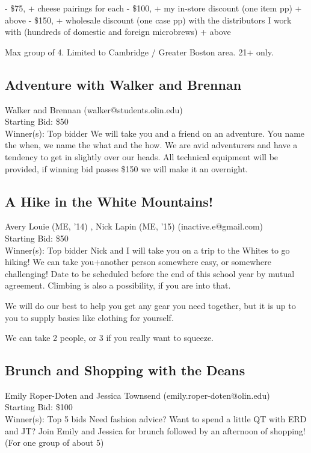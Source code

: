 \documentclass[11pt]{article}
\begin{document}
- \$75, + cheese pairings for each
- \$100, + my in-store discount (one item pp) + above
- \$150, + wholesale discount (one case pp) with the distributors I work with (hundreds of domestic and foreign microbrews) + above

Max group of 4. Limited to Cambridge / Greater Boston area. 21+ only.
\subsection{Adventure with Walker and Brennan}
Walker and Brennan (walker@students.olin.edu) \\
Starting Bid: \$50 \\
Winner(s): 
Top bidder\newline
We will take you and a friend on an adventure. You name the when, we name the what and the how. We are avid adventurers and have a tendency to get in slightly over our heads. All technical equipment will be provided, if winning bid passes \$150 we will make it an overnight.
\subsection{A Hike in the White Mountains!}
Avery Louie (ME, '14) , Nick Lapin (ME, '15) (inactive.e@gmail.com) \\
Starting Bid: \$50 \\
Winner(s): 
Top bidder\newline
Nick and I will take you on a trip to the Whites to go hiking!  We can take you+another person somewhere easy, or somewhere challenging!  Date to be scheduled before the end of this school year by mutual agreement.  Climbing is also a possibility, if you are into that.

We will do our best to help you get any gear you need together, but it is up to you to supply basics like clothing for yourself.

We can take 2 people, or 3 if you really want to squeeze.
\subsection{Brunch and Shopping with the Deans}
Emily Roper-Doten and Jessica Townsend (emily.roper-doten@olin.edu) \\
Starting Bid: \$100 \\
Winner(s): 
Top 5 bids\newline
Need fashion advice? Want to spend a little QT with ERD and JT? Join Emily and Jessica for brunch followed by an afternoon of shopping! (For one group of about 5)
\end{document}
